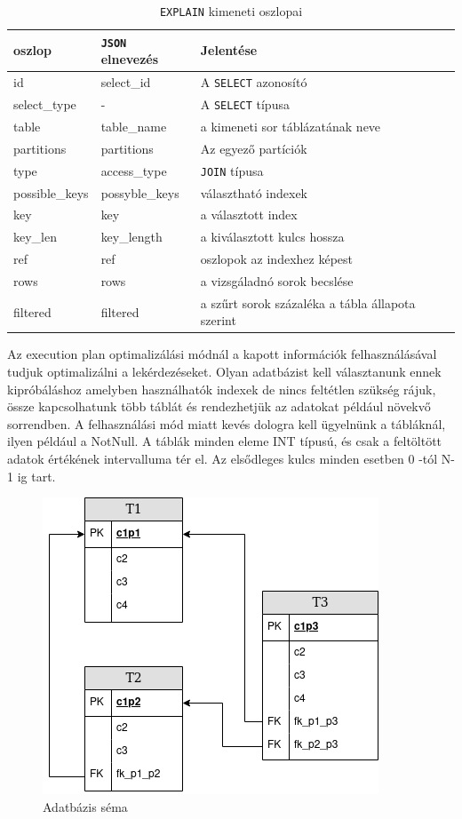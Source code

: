 \begin{table}[h!]
\centering
\caption{\texttt{EXPLAIN} kimeneti oszlopai}
\medskip
\label{tab:cpuvsgpu}
\begin{tabular}{|p{3cm}|p{3cm}|p{8cm}|}
\hline
oszlop & \texttt{JSON} elnevezés & Jelentése \\
\hline
id & select\_id & A \texttt{SELECT} azonosító \\
\hline
select\_type & - & A \texttt{SELECT} típusa \\
\hline
table & table\_name & a kimeneti sor táblázatának neve  \\
\hline
partitions & partitions & Az egyező partíciók \\
\hline
type & access\_type & \texttt{JOIN} típusa  \\
\hline
possible\_keys & possyble\_keys & választható indexek \\
\hline
key & key & a választott index \\
\hline
key\_len & key\_length & a kiválasztott kulcs hossza \\
\hline
ref & ref & oszlopok az indexhez képest \\
\hline
rows & rows & a vizsgáladnó sorok becslése \\
\hline
filtered & filtered & a szűrt sorok százaléka a tábla állapota szerint \\
\hline
\end{tabular}
\end{table}


Az execution plan optimalizálási módnál a kapott információk felhasználásával tudjuk optimalizálni a lekérdezéseket.
Olyan adatbázist kell választanunk ennek kipróbáláshoz amelyben használhatók indexek de nincs feltétlen szükség rájuk, össze kapcsolhatunk több táblát és rendezhetjük az adatokat például növekvő sorrendben. A felhasználási mód miatt kevés dologra kell ügyelnünk a tábláknál, ilyen például a NotNull. A táblák minden eleme INT típusú, és csak a feltöltött adatok értékének intervalluma tér el. Az elsődleges kulcs minden esetben 0 -tól N-1 ig tart.

\begin{figure}[h!]
\centering
\includegraphics[width=10cm]{images/new_schema.png}
\caption{Adatbázis séma}
\label{fig:schema}
\end{figure}

